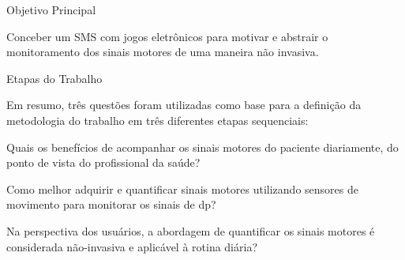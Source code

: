 \documentclass{beamer}
\begin{document}
\begin{frame}{Objetivo Principal}
  \begin{block}{}
  Conceber um SMS com jogos eletrônicos para motivar e abstrair o monitoramento dos sinais motores de uma maneira não invasiva.
  \end{block}
\end{frame}


\begin{frame}{Etapas do Trabalho}
	\begin{block}{}
	  Em resumo, três questões foram utilizadas como base para a definição da metodologia do trabalho em três diferentes etapas sequenciais:
		  \begin{description}[<+->]
		  \item[ETAPA 1] Quais os benefícios de acompanhar os sinais motores do paciente diariamente, do ponto de vista do profissional da saúde?
		  \item[ETAPA 2] Como melhor adquirir e quantificar sinais motores utilizando sensores de movimento para monitorar os sinais de \ac{dp}?
		  \item[ETAPA 3] Na perspectiva dos usuários, a abordagem de quantificar os sinais motores é considerada não-invasiva e aplicável à rotina diária?
		  \end{description}
	\end{block}
\end{frame}
\end{document}
